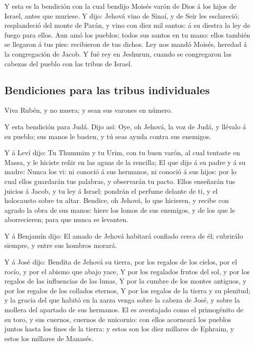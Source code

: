  Y esta es la bendición con la cual bendijo Moisés varón
de Dios á los hijos de Israel, antes que muriese.  Y dijo:
Jehová vino de Sinaí, y de Seir les esclareció; resplandeció del monte
de Parán, y vino con diez mil santos: á su diestra la ley de fuego para
ellos.  Aun amó los pueblos; todos sus santos en tu mano:
ellos también se llegaron á tus pies: recibieron de tus dichos.
 Ley nos mandó Moisés, heredad á la congregación de Jacob.
 Y fué rey en Jeshurun, cuando se congregaron las cabezas
del pueblo con las tribus de Israel.

\hypertarget{bendiciones-para-las-tribus-individuales}{%
\subsection{Bendiciones para las tribus
individuales}\label{bendiciones-para-las-tribus-individuales}}

 Viva Rubén, y no muera; y sean sus varones en número.

 Y esta bendición para Judá. Dijo así: Oye, oh Jehová, la
voz de Judá, y llévalo á su pueblo; sus manos le basten, y tú seas ayuda
contra sus enemigos.

 Y á Leví dijo: Tu Thummim y tu Urim, con tu buen varón,
al cual tentaste en Massa, y le hiciste reñir en las aguas de la
rencilla;  El que dijo á su padre y á su madre: Nunca los
vi: ni conoció á sus hermanos, ni conoció á sus hijos: por lo cual ellos
guardarán tus palabras, y observarán tu pacto.  Ellos
enseñarán tus juicios á Jacob, y tu ley á Israel; pondrán el perfume
delante de ti, y el holocausto sobre tu altar.  Bendice,
oh Jehová, lo que hicieren, y recibe con agrado la obra de sus manos:
hiere los lomos de sus enemigos, y de los que le aborrecieren; para que
nunca se levanten.

 Y á Benjamín dijo: El amado de Jehová habitará confiado
cerca de él; cubrirálo siempre, y entre sus hombros morará.

 Y á José dijo: Bendita de Jehová su tierra, por los
regalos de los cielos, por el rocío, y por el abismo que abajo yace,
 Y por los regalados frutos del sol, y por los regalos de
las influencias de las lunas,  Y por la cumbre de los
montes antiguos, y por los regalos de los collados eternos,
 Y por los regalos de la tierra y su plenitud; y la
gracia del que habitó en la zarza venga sobre la cabeza de José, y sobre
la mollera del apartado de sus hermanos.  El es
aventajado como el primogénito de su toro, y sus cuernos, cuernos de
unicornio: con ellos acorneará los pueblos juntos hasta los fines de la
tierra: y estos son los diez millares de Ephraim, y estos los millares
de Manasés.

